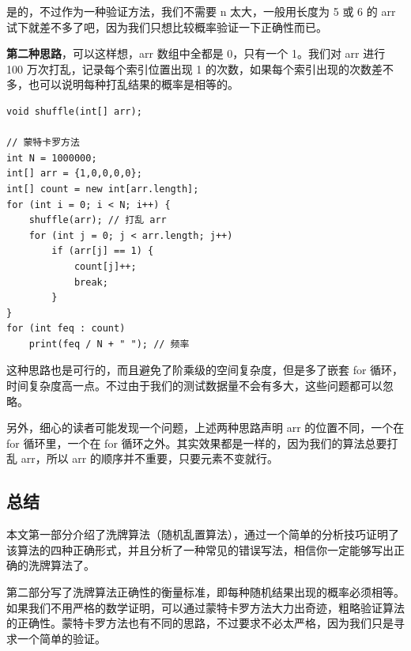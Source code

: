 \documentclass[12pt]{article}
\begin{document}
是的，不过作为一种验证方法，我们不需要 n 太大，一般用长度为 5 或 6 的 arr 试下就差不多了吧，因为我们只想比较概率验证一下正确性而已。

\textbf{第二种思路}，可以这样想，arr 数组中全都是 0，只有一个 1。我们对 arr 进行 100 万次打乱，记录每个索引位置出现 1 的次数，如果每个索引出现的次数差不多，也可以说明每种打乱结果的概率是相等的。
\begin{lstlisting}
void shuffle(int[] arr);

// 蒙特卡罗方法
int N = 1000000;    
int[] arr = {1,0,0,0,0};
int[] count = new int[arr.length];
for (int i = 0; i < N; i++) {
    shuffle(arr); // 打乱 arr
    for (int j = 0; j < arr.length; j++) 
        if (arr[j] == 1) {
            count[j]++;
            break;
        }
}
for (int feq : count) 
    print(feq / N + " "); // 频率
\end{lstlisting}

这种思路也是可行的，而且避免了阶乘级的空间复杂度，但是多了嵌套 for 循环，时间复杂度高一点。不过由于我们的测试数据量不会有多大，这些问题都可以忽略。

另外，细心的读者可能发现一个问题，上述两种思路声明 arr 的位置不同，一个在 for 循环里，一个在 for 循环之外。其实效果都是一样的，因为我们的算法总要打乱 arr，所以 arr 的顺序并不重要，只要元素不变就行。

\subsection{总结}
本文第一部分介绍了洗牌算法（随机乱置算法），通过一个简单的分析技巧证明了该算法的四种正确形式，并且分析了一种常见的错误写法，相信你一定能够写出正确的洗牌算法了。

第二部分写了洗牌算法正确性的衡量标准，即每种随机结果出现的概率必须相等。如果我们不用严格的数学证明，可以通过蒙特卡罗方法大力出奇迹，粗略验证算法的正确性。蒙特卡罗方法也有不同的思路，不过要求不必太严格，因为我们只是寻求一个简单的验证。






\end{document}
